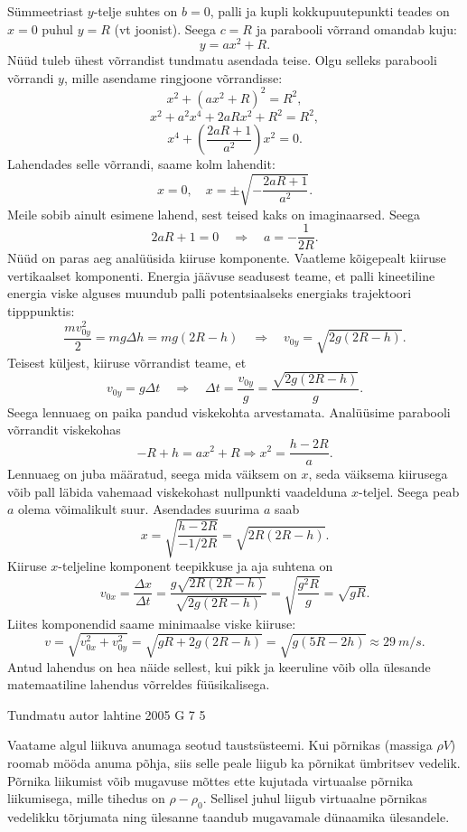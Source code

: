 \documentclass[11pt]{article}
\begin{document}
{{Sümmeetriast $y$-telje suhtes on $b = 0$, palli ja kupli kokkupuutepunkti teades on $x = 0$ puhul $y = R$ (vt joonist). Seega $c = R$ ja parabooli võrrand omandab kuju:
\[
y = ax^2 + R.
\]
Nüüd tuleb ühest võrrandist tundmatu asendada teise. Olgu selleks parabooli võrrandi $y$, mille asendame ringjoone võrrandisse:
\[
x^{2}+\left(a x^{2}+R\right)^{2}=R^{2},
\]
\[
x^{2}+a^{2} x^{4}+2 a R x^{2}+R^{2}=R^{2},
\]
\[
x^{4}+\left(\frac{2 a R+1}{a^{2}}\right) x^{2}=0.
\]
Lahendades selle võrrandi, saame kolm lahendit:
\[
x=0, \quad x=\pm \sqrt{-\frac{2 a R+1}{a^{2}}}.
\]
Meile sobib ainult esimene lahend, sest teised kaks on imaginaarsed. Seega
\[
2aR + 1 = 0 \quad\Rightarrow\quad a = - \frac{1}{2R}.
\]
Nüüd on paras aeg analüüsida kiiruse komponente. Vaatleme kõigepealt kiiruse vertikaalset komponenti. Energia jäävuse seadusest teame, et palli kineetiline energia viske alguses muundub palli potentsiaalseks energiaks trajektoori tipppunktis:
\[
\frac{m v_{0 y}^{2}}{2}=m g \Delta h=m g(2 R-h) \quad\Rightarrow\quad v_{0 y}=\sqrt{2 g(2 R-h)}.
\]
Teisest küljest, kiiruse võrrandist teame, et
\[
v_{0 y}=g \Delta t \quad \Rightarrow \quad \Delta t=\frac{v_{0 y}}{g}=\frac{\sqrt{2 g(2 R-h)}}{g}.
\]
Seega lennuaeg on paika pandud viskekohta arvestamata. Analüüsime parabooli võrrandit viskekohas
\[
-R + h = ax^2 + R \Rightarrow x^2 = \frac{h-2R}{a}.
\]
Lennuaeg on juba määratud, seega mida väiksem on $x$, seda väiksema kiirusega võib pall läbida vahemaad viskekohast nullpunkti vaadelduna $x$-teljel. Seega peab $a$ olema võimalikult suur. Asendades suurima $a$ saab
\[
x=\sqrt{\frac{h-2 R}{-1 / 2 R}}=\sqrt{2 R(2 R-h)}.
\]
Kiiruse $x$-teljeline komponent teepikkuse ja aja suhtena on
\[
v_{0 x}=\frac{\Delta x}{\Delta t}=\frac{g \sqrt{2 R(2 R-h)}}{\sqrt{2 g(2 R-h)}}=\sqrt{\frac{g^{2} R}{g}}=\sqrt{g R}.
\]
Liites komponendid saame minimaalse viske kiiruse:
\[
v=\sqrt{v_{0 x}^{2}+v_{0 y}^{2}}=\sqrt{g R+2 g(2 R-h)}=\sqrt{g(5 R-2 h)} \approx \SI{29}{m/s}.
\]
Antud lahendus on hea näide sellest, kui pikk ja keeruline võib olla ülesande matemaatiline lahendus võrreldes füüsikalisega.
\fi
}

{Tundmatu autor} %
{lahtine} %
{2005} %
{G 7} %
{5} %
{

\ifSolution
Vaatame algul liikuva anumaga seotud taustsüsteemi. Kui põrnikas (massiga $\rho V$) roomab mööda anuma põhja, siis selle peale liigub ka põrnikat ümbritsev vedelik. Põrnika liikumist võib mugavuse mõttes ette kujutada virtuaalse põrnika liikumisega, mille tihedus on $\rho - \rho_0$. Sellisel juhul liigub virtuaalne põrnikas vedelikku tõrjumata ning ülesanne taandub mugavamale dünaamika ülesandele.

}}
\end{document}
